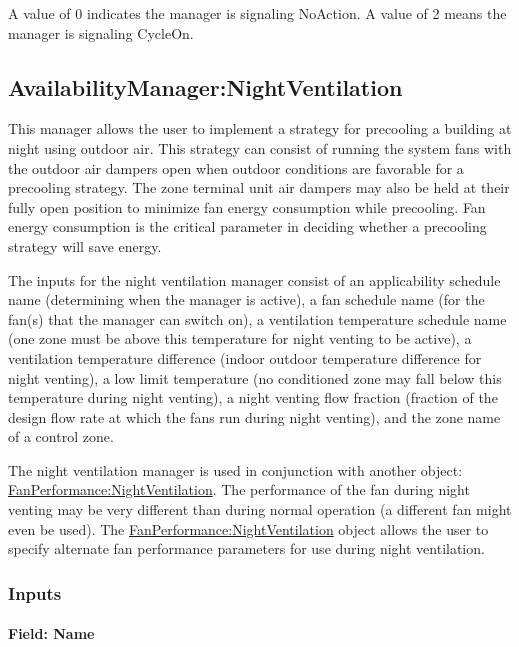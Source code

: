 A value of 0 indicates the manager is signaling NoAction. A value of 2 means the manager is signaling CycleOn.

\subsection{AvailabilityManager:NightVentilation}\label{availabilitymanagernightventilation}

This manager allows the user to implement a strategy for precooling a building at night using outdoor air. This strategy can consist of running the system fans with the outdoor air dampers open when outdoor conditions are favorable for a precooling strategy. The zone terminal unit air dampers may also be held at their fully open position to minimize fan energy consumption while precooling. Fan energy consumption is the critical parameter in deciding whether a precooling strategy will save energy.

The inputs for the night ventilation manager consist of an applicability schedule name (determining when the manager is active), a fan schedule name (for the fan(s) that the manager can switch on), a ventilation temperature schedule name (one zone must be above this temperature for night venting to be active), a ventilation temperature difference (indoor outdoor temperature difference for night venting), a low limit temperature (no conditioned zone may fall below this temperature during night venting), a night venting flow fraction (fraction of the design flow rate at which the fans run during night venting), and the zone name of a control zone.

The night ventilation manager is used in conjunction with another object: \hyperref[fanperformancenightventilation]{FanPerformance:NightVentilation}. The performance of the fan during night venting may be very different than during normal operation (a different fan might even be used). The \hyperref[fanperformancenightventilation]{FanPerformance:NightVentilation} object allows the user to specify alternate fan performance parameters for use during night ventilation.

\subsubsection{Inputs}\label{inputs-9-023}

\paragraph{Field: Name}\label{field-name-8-021}

